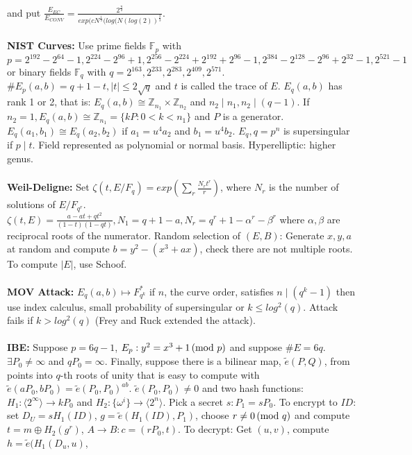 and put 
${\frac {E_{EC}} {E_{CONV}}}= 
{\frac {2^{\frac n 2}} {exp (c N^{\frac 1 3}(log(N (log(2))^{\frac 2 3}}}$.
\\
\\
{\bf NIST Curves:} Use prime fields ${\mathbb F}_p$ with $p=
2^{192}-2^{ 64}-1,
2^{224}-2^{ 96}+1,
2^{256}-2^{224}+ 2^{192}+2^{96}-1,
2^{384}-2^{128}- 2^{96}+2^{32}-1,
2^{521}-1$ or  binary fields ${\mathbb F}_{q}$ with $q=
2^{163}, 2^{233}, 2^{283}, 2^{409}, 2^{571}$.  $\#E_p(a,b)=q+1-t, |t| \le 2 {\sqrt q}$ and
$t$ is called the trace of $E$.  $E_q(a,b)$ has rank 1 or 2, that is:
$E_q(a,b) \cong {\mathbb Z}_{n_1} \times {\mathbb Z}_{n_2}$ and $n_2 \mid n_1, n_2 \mid (q-1)$.
If $n_2=1, E_q(a,b) \cong {\mathbb Z}_{n_1}= \{kP: 0<k<n_1 \}$ and $P$ is a generator.
$E_q(a_1, b_1) \cong E_q(a_2, b_2)$ if 
$a_1= u^4 a_2$ and $b_1= u^4 b_2$.  $E_q, q= p^n$ is supersingular if $p \mid t$.  Field
represented as polynomial or normal basis.  Hyperelliptic: higher genus.
\\
\\
{\bf Weil-Deligne:}
Set $\zeta(t,E/F_q)= exp(\sum_r {\frac {N_r t^r} r})$, where $N_r$ is the
number of solutions of $E/F_{q^r}$.  $\zeta(t,E)= {\frac {a-at+qt^2} {(1-t)(1-qt)}},
N_1=q+1-a, N_r= q^r +1 - \alpha^r - \beta^r$ where $\alpha, \beta$ are reciprocal roots
of the numerator.  Random selection of $(E,B)$:  Generate $x,y,a$ at random and compute
$b= y^2-(x^3+ax)$, check there are not multiple roots.  To compute $|E|$,
use Schoof.
\\
\\
{\bf MOV Attack:} $E_q(a,b) \mapsto F^*_{q^k}$ if $n$, the curve order, satisfies
$n \mid (q^k-1)$ then use index calculus, small probability of supersingular or
$k \le log^2(q)$.  Attack fails if $k>log^2(q)$ (Frey and Ruck extended the attack).
\\
\\
{\bf IBE:} Suppose $p=6q-1$, $E_p: y^2 = x^3 + 1 \thinspace \textnormal{(mod } p \textnormal{)}$ and suppose $\#E= 6q$.
$\exists P_0 \ne \infty$ and
$qP_0 = \infty$.  Finally, suppose there is a bilinear map,
${\tilde {e}}(P,Q)$, from points into $q$-th
roots of unity that is easy to compute with
$\tilde {e}(aP_0,bP_0)= \tilde {e}(P_0, P_0)^{ab}$.
$\tilde{e}(P_0 , P_0) \ne 0$ and two hash functions: 
$H_1: \langle 2^{\infty} \rangle \rightarrow kP_0$
and $H_2: \{\omega^i\} \rightarrow \langle 2^n \rangle$.  
Pick a secret $s: P_1=sP_0$.  To encrypt
to $ID$: set $D_U= sH_1(ID)$, $g= \tilde {e}(H_1(ID), P_1)$,
choose $r \ne 0 \thinspace \textnormal{(mod } q \textnormal{)}$ and compute $t= m \oplus H_2(g^r)$, $A \rightarrow B:
c=(r P_0 , t)$.  To decrypt:  Get $(u,v)$, compute $h= \tilde {e} (H_1(D_u, u)$,
